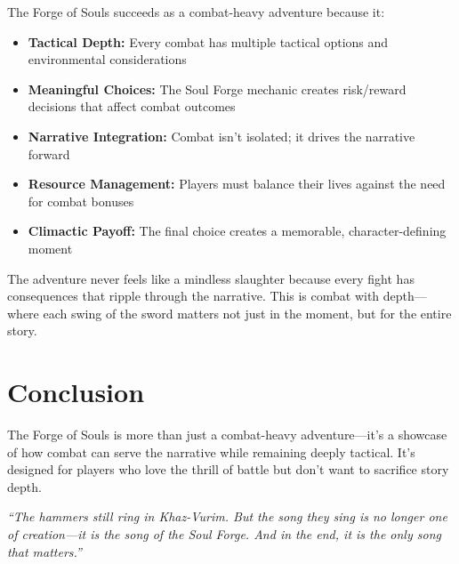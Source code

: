 \documentclass[11pt]{article}
\begin{document}
The Forge of Souls succeeds as a combat-heavy adventure because it:

\begin{itemize}
    \item \textbf{Tactical Depth:} Every combat has multiple tactical options and environmental considerations
    \item \textbf{Meaningful Choices:} The Soul Forge mechanic creates risk/reward decisions that affect combat outcomes
    \item \textbf{Narrative Integration:} Combat isn't isolated; it drives the narrative forward
    \item \textbf{Resource Management:} Players must balance their lives against the need for combat bonuses
    \item \textbf{Climactic Payoff:} The final choice creates a memorable, character-defining moment
\end{itemize}

The adventure never feels like a mindless slaughter because every fight has consequences that ripple through the narrative. This is combat with depth---where each swing of the sword matters not just in the moment, but for the entire story.

\section{Conclusion}

The Forge of Souls is more than just a combat-heavy adventure---it's a showcase of how combat can serve the narrative while remaining deeply tactical. It's designed for players who love the thrill of battle but don't want to sacrifice story depth.

\begin{center}
\textit{``The hammers still ring in Khaz-Vurim. But the song they sing is no longer one of creation---it is the song of the Soul Forge. And in the end, it is the only song that matters.''}
\end{center}
\end{document}
